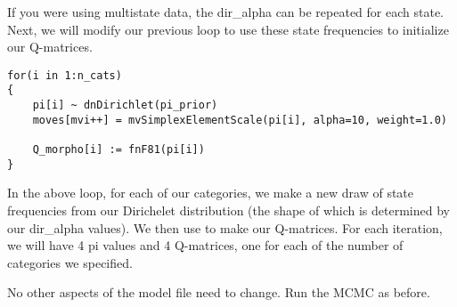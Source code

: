 If you were using multistate data, the dir\_alpha can be repeated for each state.
Next, we will modify our previous loop to use these state frequencies to initialize our Q-matrices.

{\tt \begin{snugshade*}
\begin{lstlisting}for(i in 1:n_cats)
{
	pi[i] ~ dnDirichlet(pi_prior)
    moves[mvi++] = mvSimplexElementScale(pi[i], alpha=10, weight=1.0) 
    
    Q_morpho[i] := fnF81(pi[i])
}
\end{lstlisting}
\end{snugshade*}}

In the above loop, for each of our categories, we make a new draw of state frequencies from our Dirichelet distribution (the shape of which is determined by our dir\_alpha values).  
We then use  to make our Q-matrices.
For each  iteration, we will have 4 pi values and 4 Q-matrices, one for each of the number of categories we specified. \par

No other aspects of the model file need to change.
Run the MCMC as before. \par
